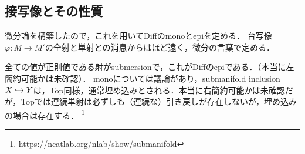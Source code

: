\documentclass[uplatex,dvipdfmx]{jsreport}
\begin{document}
\subsection{接写像とその性質}

\begin{tcolorbox}[colframe=ForestGreen, colback=ForestGreen!10!white,breakable,colbacktitle=ForestGreen!40!white,coltitle=black,fonttitle=\bfseries\sffamily,
title=]
    微分論を構築したので，これを用いてDiffのmonoとepiを定める．
    台写像$\varphi:M\to M'$の全射と単射との消息からはほど遠く，微分の言葉で定める．
    
    全ての値が正則値である射がsubmersionで，これがDiffのepiである．（本当に左簡約可能かは未確認）．
    monoについては議論があり，submanifold inclusion $X\hookrightarrow Y$は，Top同様，通常埋め込みとされる．本当に右簡約可能かは未確認だが，Topでは連続単射は必ずしも（連続な）引き戻しが存在しないが，埋め込みの場合は存在する．
    \footnote{\url{https://ncatlab.org/nlab/show/submanifold}}
\end{tcolorbox}
\end{document}
